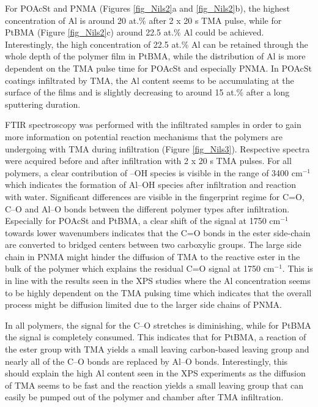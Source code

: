 \documentclass[AMA,STIX2COL]{WileyNJD-v2} %
\begin{document}
For POAcSt and PNMA (Figures \ref{fig_Nils2}a and \ref{fig_Nils2}b), the highest concentration of Al is around 20 at.\% after 2 x 20 s TMA pulse, while for PtBMA (Figure \ref{fig_Nils2}c) around 22.5 at.\% Al could be achieved. Interestingly, the high concentration of 22.5 at.\% Al can be retained through the whole depth of the polymer film in PtBMA, while the distribution of Al is more dependent on the TMA pulse time for POAcSt and especially PNMA. In POAcSt coatings infiltrated by TMA, the Al content seems to be accumulating at the surface of the films and is slightly decreasing to around 15 at.\% after a long sputtering duration.

FTIR spectroscopy was performed with the infiltrated samples in order to gain more information on potential reaction mechanisms that the polymers are undergoing with TMA during infiltration (Figure \ref{fig_Nils3}). Respective spectra were acquired before and after infiltration with 2 x 20 s TMA pulses. For all polymers, a clear contribution of –OH species is visible in the range of 3400 cm$^{-1}$ which indicates the formation of Al–OH species after infiltration and reaction with water. Significant differences are visible in the fingerprint regime for C=O, C–O and Al–O bonds between the different polymer types after infiltration. Especially for POAcSt and PtBMA, a clear shift of the signal at 1750 cm$^{-1}$ towards lower wavenumbers indicates that the C=O bonds in the ester side-chain are converted to bridged centers between two carboxylic groups. The large side chain in PNMA might hinder the diffusion of TMA to the reactive ester in the bulk of the polymer which explains the residual C=O signal at 1750 cm$^{-1}$. This is in line with the results seen in the XPS studies where the Al concentration seems to be highly dependent on the TMA pulsing time which indicates that the overall process might be diffusion limited due to the larger side chains of PNMA.

In all polymers, the signal for the C–O stretches is diminishing, while for PtBMA the signal is completely consumed. This indicates that for PtBMA, a reaction of the ester group with TMA yields a small leaving carbon-based leaving group and nearly all of the C–O bonds are replaced by Al–O bonds. Interestingly, this should explain the high Al content seen in the XPS experiments as the diffusion of TMA seems to be fast and the reaction yields a small leaving group that can easily be pumped out of the polymer and chamber after TMA infiltration.
\end{document}
